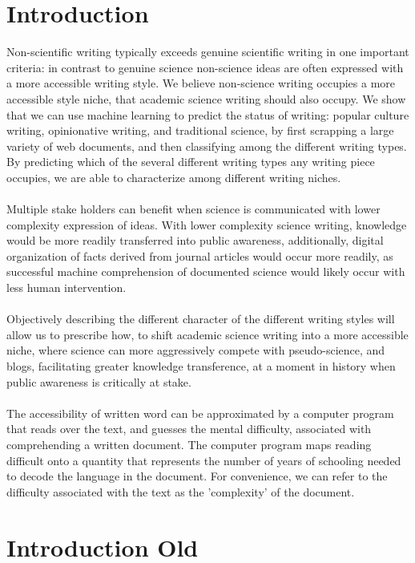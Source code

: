 \documentclass{clv3}
\begin{document}
\section{Introduction}
Non-scientific writing typically exceeds genuine scientific writing in one important criteria: in contrast to genuine science non-science ideas are often expressed with a more accessible writing style. We believe non-science writing occupies a more accessible style niche, that academic science writing should also occupy. We show that we can use machine learning to predict the status of writing: popular culture writing, opinionative writing, and traditional science, by first scrapping a large variety of web documents, and then classifying among the different writing types. By predicting which of the several different writing types any writing piece occupies, we are able to characterize among different writing niches.\\
\\
Multiple stake holders can benefit when science is communicated with lower complexity expression of ideas. With lower complexity science writing, knowledge would be more readily transferred into public awareness, additionally, digital organization of facts derived from journal articles would occur more readily, as successful machine comprehension of documented science would likely occur with less human intervention.\\
\\
Objectively describing the different character of the different writing styles will allow us to prescribe how, to shift academic science writing into a more accessible niche, where science can more aggressively compete with pseudo-science, and blogs, facilitating greater knowledge transference, at a moment in history when public awareness is critically at stake.\\
\\
The accessibility of written word can be approximated by a computer program that reads over the text, and guesses the mental difficulty, associated with comprehending a written document. The computer program maps reading difficult onto a quantity that represents the number of years of schooling needed to decode the language in the document. For convenience, we can refer to the difficulty associated with the text as the 'complexity' of the document. 


\section{Introduction Old}
\end{document}

